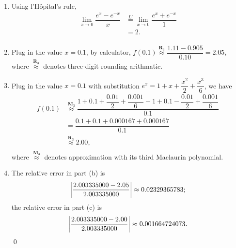 \documentclass[11pt]{article}
\theoremstyle{break}
\numberwithin{equation}{theorem}
\begin{document}
\begin{enumerate}
    \item Using l'Hôpital's rule, \vspace{-0.6em}
    \begin{align*}
        \lim_{x\to 0}\dfrac{e^x-e^{-x}}{x}&\overset{L'}{=}\lim_{x\to 0}\dfrac{e^x+e^{-x}}{1}\\
        &=2.\\[-3.4em]
    \end{align*}
    \item Plug in the value $x=0.1$, by calculator, $f(0.1)\overset{\textbf{R}_3}{\approx}\dfrac{1.11-0.905}{0.10}=2.05$, where $\overset{\textbf{R}_3}{\approx}$ denotes three-digit rounding arithmatic.
    \item Plug in the value $x=0.1$ with substitution $e^x=1+x+\dfrac{x^2}{2}+\dfrac{x^3}{6}$, we have \vspace{-0.6em}
    \begin{align*}
        f(0.1)&\overset{\textbf{M}_{3}}{\approx}\dfrac{1+0.1+\dfrac{0.01}{2}+\dfrac{0.001}{6}-1+0.1-\dfrac{0.01}{2}+\dfrac{0.001}{6}}{0.1}\\
        &=\dfrac{0.1+0.1+0.000167+0.000167}{0.1}\\
        &\overset{\textbf{R}_3}{\approx}2.00,\\[-3.4em]
    \end{align*}
    where $\overset{\textbf{M}_{3}}{\approx}$ denotes approximation with its third Maclaurin polynomial.
    \item The relative error in part (b) is \vspace{-0.6em}
    \begin{equation*}
        \left|\dfrac{2.003335000-2.05}{2.003335000}\right|\approx0.02329365783; \vspace{-0.6em}
    \end{equation*}
    the relative error in part (c) is \vspace{-0.6em}
    \begin{equation*}
        \left|\dfrac{2.003335000-2.00}{2.003335000}\right|\approx0.001664724073. \vspace{-0.6em}
    \end{equation*}
    \qed
\end{enumerate}
\end{document}
